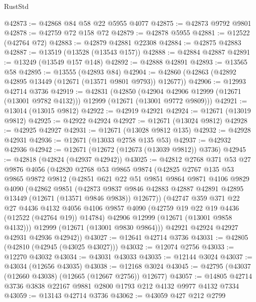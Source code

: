\begin{lexlean}{RustStd}
\begin{coremodule}
@42873 := @42868 @84 @58 @22 @5955 @4077
@42875 := @42873 @9792 @9801
@42878 := @42759 @72 @158 @72
@42879 := @42878 @5955
@42881 := @12522 (@42764 @72)
@42883 := @42879 @42881 @22308
@42884 := @42875 @42883
@42887 := @13519 (@13528 (@13543 @157))
@42888 := @42884 @42887
@42891 := @13249 (@13549 @157 @148)
@42892 := @42888 @42891
@42893 := @13565 @58
@42895 := @13555 (@42893 @84)
@42904 := @42860 (@42863 (@42892 @42895 @13449 (@12671 (@13571 @9801 @9793)) @12677))
@42906 := @12993 @42714 @3736
@42919 := @42831
    (@42850
      (@42904 @42906 @12999 (@12671 (@13001 @9782 @4132)))
      @12999
      (@12671 (@13001 @9772 @9809)))
@42921 := @13014 (@13015 @9812)
@42922 := @42919 @42921
@42924 := @12671 (@13019 @9812)
@42925 := @42922 @42924
@42927 := @12671 (@13024 @9812)
@42928 := @42925 @42927
@42931 := @12671 (@13028 @9812 @135)
@42932 := @42928 @42931
@42936 := @12671 (@13033 @2758 @135 @53)
@42937 := @42932 @42936
@42942 := @12671 (@12672 (@12673 (@13039 @9812)) @3736)
@42945 := @42818 (@42824 (@42937 @42942))
@43025 := @42812
    @2768
    @371
    @53
    @27
    @9876
    @4056
    (@42820
      @2768
      @53
      @9865
      @9874
      (@42825
        @2767
        @135
        @53
        @9865
        @9872
        @9812
        (@42851
          @621
          @22
          @51
          @9851
          @9864
          @9871
          @4106
          @9829
          @4090
          (@42862
            @9851
            (@42873
              @9837
              @9846
              @42883
              @42887
              @42891
              @42895
              @13449
              (@12671 (@13571 @9846 @9838))
              @12677))
          (@42747
            @359
            @371
            @22
            @27
            @4436
            @4132
            @4056
            @4106
            @9857
            @4090
            (@42759 @19 @22 @19 @4436 (@12522 (@42764 @19)) @14784)
            @42906
            @12999
            (@12671 (@13001 @9858 @4132)))
          @12999
          (@12671 (@13001 @9830 @9864)))
        @42921
        @42924
        @42927
        @42931
        @42936
        @42942))
@43027 := @12641 @42714 @3736
@43031 := @42805 (@42810 (@42945 (@43025 @43027)))
@43032 := @12074 @2756
@43033 := @12270 @43032
@43034 := @43031 @43033
@43035 := @12144 @3024
@43037 := @43034 (@12656 @43035)
@43038 := @12168 @3024
@43045 := @42795 (@43037 (@12660 @43038) (@12665 (@12667 @2756)) @12677)
@43057 := @14805 @42714 @3736 @3838 @22167 @9881 @2800 @1793 @212 @4132 @9977 @4132 @7334
@43059 := @13143 @42714 @3736
@43062 := @43059 @427 @212 @2799

\end{coremodule}
\end{lexlean}
